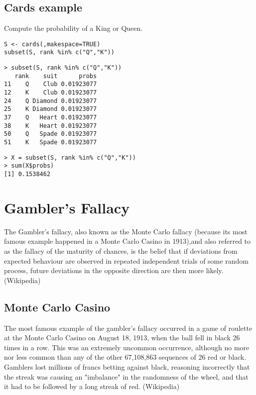 \documentclass[11pt]{article} %
\begin{document}
\newpage
\subsection{Cards example}
Compute the probability of a King or Queen.
\begin{framed}
\begin{verbatim}
S <- cards(,makespace=TRUE)
subset(S, rank %in% c("Q","K"))
\end{verbatim}
\end{framed}

\begin{verbatim}
> subset(S, rank %in% c("Q","K"))
   rank    suit      probs
11    Q    Club 0.01923077
12    K    Club 0.01923077
24    Q Diamond 0.01923077
25    K Diamond 0.01923077
37    Q   Heart 0.01923077
38    K   Heart 0.01923077
50    Q   Spade 0.01923077
51    K   Spade 0.01923077
\end{verbatim}

\begin{verbatim}
> X = subset(S, rank %in% c("Q","K"))
> sum(X$probs)
[1] 0.1538462
\end{verbatim}
\newpage
\section{Gambler's Fallacy}


The Gambler's fallacy, also known as the Monte Carlo fallacy (because its most famous example happened in a Monte Carlo Casino in 1913),and also referred to as the fallacy of the maturity of chances, is the belief that if deviations from expected behaviour are observed in repeated independent trials of some random process, future deviations in the opposite direction are then more likely. (Wikipedia)
\subsection{Monte Carlo Casino}

The most famous example of the gambler’s fallacy occurred in a game of roulette at the Monte Carlo Casino on August 18, 1913, when the ball fell in black 26 times in a row. This was an extremely uncommon occurrence, although no more nor less common than any of the other 67,108,863 sequences of 26 red or black. Gamblers lost millions of francs betting against black, reasoning incorrectly that the streak was causing an "imbalance" in the randomness of the wheel, and that it had to be followed by a long streak of red. (Wikipedia)
\end{document}
